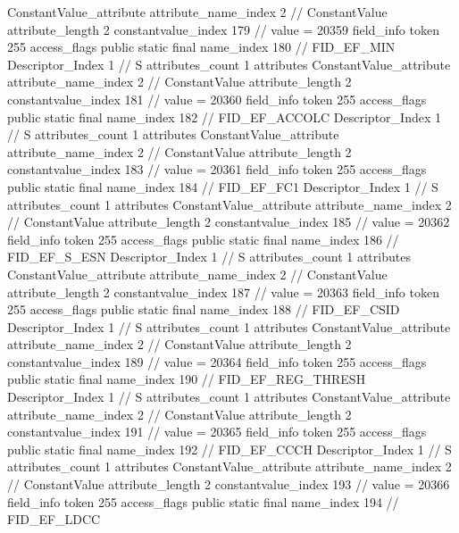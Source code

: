 {{{{{{				ConstantValue_attribute {
					attribute_name_index	2		// ConstantValue
					attribute_length	2
					constantvalue_index	179		// value = 20359
				}
				}
			}
			field_info {
				token	255
				access_flags	public static final
				name_index	180		// FID_EF_MIN
				Descriptor_Index	1		// S
				attributes_count	1
				attributes {
				ConstantValue_attribute {
					attribute_name_index	2		// ConstantValue
					attribute_length	2
					constantvalue_index	181		// value = 20360
				}
				}
			}
			field_info {
				token	255
				access_flags	public static final
				name_index	182		// FID_EF_ACCOLC
				Descriptor_Index	1		// S
				attributes_count	1
				attributes {
				ConstantValue_attribute {
					attribute_name_index	2		// ConstantValue
					attribute_length	2
					constantvalue_index	183		// value = 20361
				}
				}
			}
			field_info {
				token	255
				access_flags	public static final
				name_index	184		// FID_EF_FC1
				Descriptor_Index	1		// S
				attributes_count	1
				attributes {
				ConstantValue_attribute {
					attribute_name_index	2		// ConstantValue
					attribute_length	2
					constantvalue_index	185		// value = 20362
				}
				}
			}
			field_info {
				token	255
				access_flags	public static final
				name_index	186		// FID_EF_S_ESN
				Descriptor_Index	1		// S
				attributes_count	1
				attributes {
				ConstantValue_attribute {
					attribute_name_index	2		// ConstantValue
					attribute_length	2
					constantvalue_index	187		// value = 20363
				}
				}
			}
			field_info {
				token	255
				access_flags	public static final
				name_index	188		// FID_EF_CSID
				Descriptor_Index	1		// S
				attributes_count	1
				attributes {
				ConstantValue_attribute {
					attribute_name_index	2		// ConstantValue
					attribute_length	2
					constantvalue_index	189		// value = 20364
				}
				}
			}
			field_info {
				token	255
				access_flags	public static final
				name_index	190		// FID_EF_REG_THRESH
				Descriptor_Index	1		// S
				attributes_count	1
				attributes {
				ConstantValue_attribute {
					attribute_name_index	2		// ConstantValue
					attribute_length	2
					constantvalue_index	191		// value = 20365
				}
				}
			}
			field_info {
				token	255
				access_flags	public static final
				name_index	192		// FID_EF_CCCH
				Descriptor_Index	1		// S
				attributes_count	1
				attributes {
				ConstantValue_attribute {
					attribute_name_index	2		// ConstantValue
					attribute_length	2
					constantvalue_index	193		// value = 20366
				}
				}
			}
			field_info {
				token	255
				access_flags	public static final
				name_index	194		// FID_EF_LDCC
}}}}}
